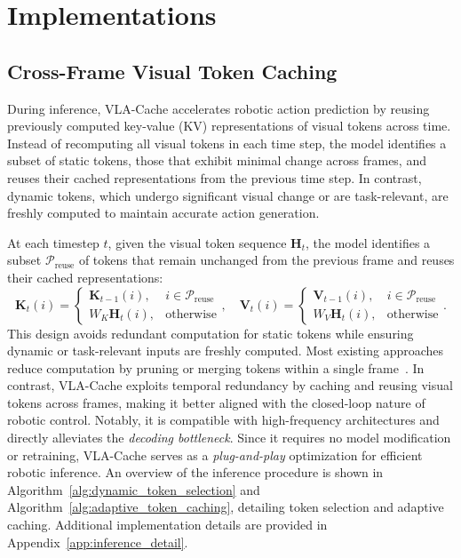 \section{Implementations}

\subsection{Cross-Frame Visual Token Caching}
During inference, VLA-Cache accelerates robotic action prediction by reusing previously computed key-value (KV) representations of visual tokens across time. Instead of recomputing all visual tokens in each time step, the model identifies a subset of static tokens, those that exhibit minimal change across frames, and reuses their cached representations from the previous time step. In contrast, dynamic tokens, which undergo significant visual change or are task-relevant, are freshly computed to maintain accurate action generation.

At each timestep $t$, given the visual token sequence $\mathbf{H}_t$, the model identifies a subset $\mathcal{P}_{\text{reuse}}$ of tokens that remain unchanged from the previous frame and reuses their cached representations:
\begin{equation}
\mathbf{K}_t(i) =
\begin{cases}
\mathbf{K}_{t-1}(i), & i \in \mathcal{P}_{\text{reuse}} \\
W_K \mathbf{H}_t(i), & \text{otherwise}
\end{cases}, \quad
\mathbf{V}_t(i) =
\begin{cases}
\mathbf{V}_{t-1}(i), & i \in \mathcal{P}_{\text{reuse}} \\
W_V \mathbf{H}_t(i), & \text{otherwise}
\end{cases}.
\end{equation}
This design avoids redundant computation for static tokens while ensuring dynamic or task-relevant inputs are freshly computed. Most existing approaches reduce computation by pruning or merging tokens within a single frame~\cite{chen2025image, zhang2024sparsevlm, bolya2022token, cao2023pumer, cao2024madtp}. In contrast, VLA-Cache exploits temporal redundancy by caching and reusing visual tokens across frames, making it better aligned with the closed-loop nature of robotic control. Notably, it is compatible with high-frequency architectures and directly alleviates the \textit{decoding bottleneck}. Since it requires no model modification or retraining, VLA-Cache serves as a \textit{plug-and-play} optimization for efficient robotic inference.
An overview of the inference procedure is shown in Algorithm~\ref{alg:dynamic_token_selection} and Algorithm~\ref{alg:adaptive_token_caching}, detailing token selection and adaptive caching. Additional implementation details are provided in Appendix~\ref{app:inference_detail}.


